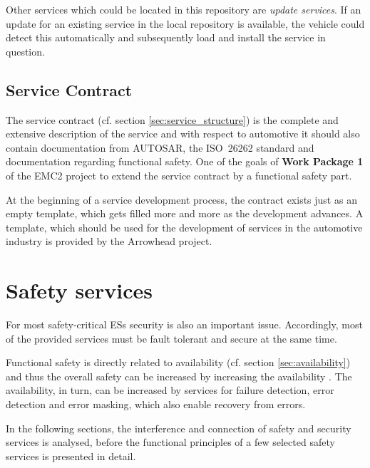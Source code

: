 Other services which could be located in this repository are \emph{update services}. If an update for an existing service in the local repository is available, the vehicle could detect this automatically and subsequently load and install the service in question.


\subsection{Service Contract}

The service contract (cf. section \ref{sec:service_structure}) is the complete and extensive description of the service and with respect to automotive it should also contain documentation from AUTOSAR, the \mbox{ISO 26262} standard and documentation regarding functional safety. One of the goals of \textbf{Work Package 1} of the EMC2 project to extend the service contract by a functional safety part.

At the beginning of a service development process, the contract exists just as an empty template, which gets filled more and more as the development advances. A template, which should be used for the development of services in the automotive industry is provided by the Arrowhead project.













\section{Safety services}

For most safety-critical ESs security is also an important issue. Accordingly, most of the provided services must be fault tolerant and secure at the same time.

Functional safety is directly related to availability (cf. section \ref{sec:availability}) and thus the overall safety can be increased by increasing the availability \cite{turek2011}. The availability, in turn, can be increased by services for failure detection, error detection and error masking, which also enable recovery from errors.

In the following sections, the interference and connection of safety and security services is analysed, before the functional principles of a few selected safety services is presented in detail.

